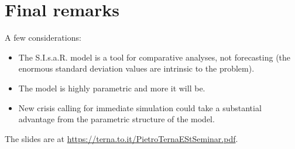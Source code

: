 \documentclass[8pt]{beamer}
\begin{document}
\section{Final remarks}

\begin{frame}{A few considerations:}

\begin{itemize}

\item The S.I.s.a.R. model is a tool for comparative analyses, not forecasting (the enormous standard deviation values are intrinsic to the problem).

\bigskip
\item The model is highly parametric and more it will be.

\bigskip
\item New crisis calling for immediate simulation could take a substantial advantage from the parametric structure of the model.

\end{itemize}

 \bigskip
 The slides are at \url{https://terna.to.it/PietroTernaEStSeminar.pdf}.
 
\end{frame}
\end{document}
